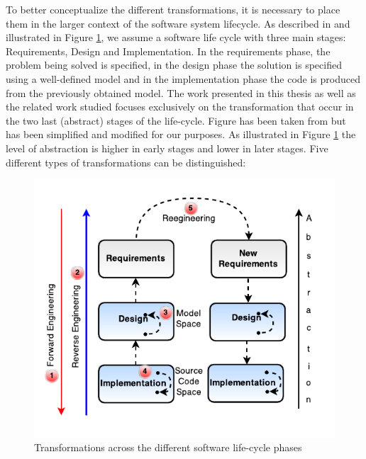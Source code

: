 To better conceptualize the different transformations, it is necessary to place them in the larger context of the software system lifecycle. As described in \cite{Chikofsky} and illustrated in Figure \ref{fig:re}, we assume a software life cycle with three main stages: Requirements, Design and Implementation. In the requirements phase, the problem being solved is specified, in the design phase the solution is specified using a well-defined model and in the implementation phase the code is produced from the previously obtained model. The work presented in this thesis as well as the related work studied focuses exclusively on the transformation that occur in the two last (abstract) stages of the life-cycle. Figure has been taken from \cite{Chikofsky} but has been simplified and modified for our purposes. As illustrated in Figure \ref{fig:re} the level of abstraction is higher in early stages and lower in later stages. Five different types of transformations can be distinguished:

\begin{figure}[h]
\centering
\includegraphics{Figures/transformationsRE}
\caption{Transformations across the different software life-cycle phases}
\label{fig:re}
\end{figure}

